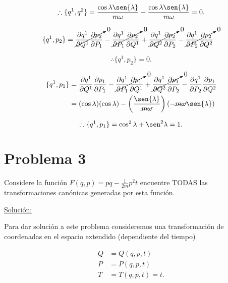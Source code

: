\documentclass[a4paper,10pt]{article}
\numberwithin{equation}{section}
\begin{document}
\begin{equation}
 \therefore  \{q^1,q^2\} =  \frac{\cos{\lambda}\sen{\lambda}}{m\omega} -
 \frac{\cos{\lambda}\sen{\lambda}}{m\omega} =0.
\end{equation}

\begin{align*}
 \{q^1,p_2\} &= \cancelto{0}{\frac{\partial q^1}{\partial Q^1}\frac{\partial p_2}{\partial P_1}} - 
 \cancelto{0}{\frac{\partial q^1}{\partial P_1}\frac{\partial p_2}{\partial Q^1}} + 
 \cancelto{0}{\frac{\partial q^1}{\partial Q^2}\frac{\partial p_2}{\partial P_2}} -
 \cancelto{0}{\frac{\partial q^1}{\partial P_2}\frac{\partial p_2}{\partial Q^2}}
\end{align*}

\begin{equation}
 \therefore  \{q^1,p_2\} = 0.
\end{equation}


\begin{align*}
 \{q^1,p_1\} &= \frac{\partial q^1}{\partial Q^1}\frac{\partial p_1}{\partial P_1} - 
 \cancelto{0}{\frac{\partial q^1}{\partial P_1}\frac{\partial p_1}{\partial Q^1}} + 
 \cancelto{0}{\frac{\partial q^1}{\partial Q^2}\frac{\partial p_1}{\partial P_2}} -
 \frac{\partial q^1}{\partial P_2}\frac{\partial p_1}{\partial Q^2} \\
 &= (\cos{\lambda})(\cos{\lambda}) - \left(\frac{\sen{\lambda}}{\cancel{m\omega}}\right)
 (- \cancel{m\omega} \sen{\lambda})
\end{align*}

\begin{equation}
 \therefore \{q^1,p_1\} = \cos^2{\lambda} + \sen^2{\lambda} = 1.
\end{equation}


\section{Problema 3}

Considere la función $F(q,p) = pq - \frac{1}{2m}p^2 t$ encuentre TODAS las transformaciones 
canónicas generadas por esta función.

\vspace{.3cm}

\underline{Solución:} \vspace{.3cm}

Para dar solución a este problema consideremos una transformación de 
coordenadas en el espacio extendido (dependiente del tiempo) 

\begin{align*}
 Q &= Q(q,p,t) \\
 P &= P(q,p,t) \\
 T &= T(q,p,t) = t.
\end{align*}
\end{document}
